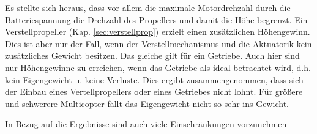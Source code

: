 Es stellte sich heraus, dass vor allem die maximale Motordrehzahl durch die Batteriespannung die Drehzahl des Propellers und damit die Höhe begrenzt. Ein Verstellpropeller (Kap. \ref{sec:verstellprop}) erzielt einen zusätzlichen Höhengewinn. Dies ist aber nur der Fall, wenn der Verstellmechanismus und die Aktuatorik kein zusätzliches Gewicht besitzen. Das gleiche gilt für ein Getriebe. Auch hier sind nur Höhengewinne zu erreichen, wenn das Getriebe als ideal betrachtet wird, d.h. kein Eigengewicht u. keine Verluste. Dies ergibt zusammengenommen, dass sich der Einbau eines Vertellpropellers oder eines Getriebes nicht lohnt. Für größere und schwerere Multicopter fällt das Eigengewicht nicht so sehr ins Gewicht. 




In Bezug auf die Ergebnisse sind auch viele Einschränkungen vorzunehmen

